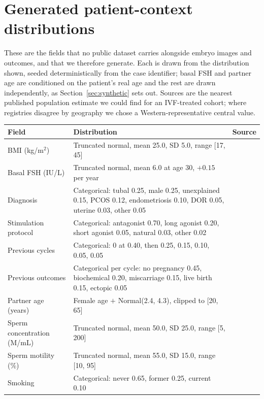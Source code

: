\documentclass[11pt]{article}
\begin{document}
\section{Generated patient-context distributions}
\label{app:distributions}
These are the fields that no public dataset carries alongside embryo images and outcomes, and that we therefore generate. Each is drawn from the distribution shown, seeded deterministically from the case identifier; basal FSH and partner age are conditioned on the patient's real age and the rest are drawn independently, as Section~\ref{sec:synthetic} sets out. Sources are the nearest published population estimate we could find for an IVF-treated cohort; where registries disagree by geography we chose a Western-representative central value.

\begin{table}[H]
\centering\footnotesize
\begin{tabular}{p{3.1cm}p{7.4cm}p{2.6cm}}
\toprule
\textbf{Field} & \textbf{Distribution} & \textbf{Source} \\
\midrule
BMI (kg/m$^2$) & Truncated normal, mean 25.0, SD 5.0, range [17, 45] & \citet{eshre2025} \\
Basal FSH (IU/L) & Truncated normal, mean 6.0 at age 30, $+0.15$ per year & \citet{eshre2025} \\
Diagnosis & Categorical: tubal 0.25, male 0.25, unexplained 0.15, PCOS 0.12, endometriosis 0.10, DOR 0.05, uterine 0.03, other 0.05 & \citet{eshre2025} \\
Stimulation protocol & Categorical: antagonist 0.70, long agonist 0.20, short agonist 0.05, natural 0.03, other 0.02 & \citet{yoo2026} \\
Previous cycles & Categorical: 0 at 0.40, then 0.25, 0.15, 0.10, 0.05, 0.05 & \citet{vanderborght2025} \\
Previous outcomes & Categorical per cycle: no pregnancy 0.45, biochemical 0.20, miscarriage 0.15, live birth 0.15, ectopic 0.05 & \citet{vanderborght2025} \\
Partner age (years) & Female age $+$ Normal(2.4, 4.3), clipped to [20, 65] & \citet{jelinkova2026} \\
Sperm concentration (M/mL) & Truncated normal, mean 50.0, SD 25.0, range [5, 200] & \citet{who2021semen} \\
Sperm motility (\%) & Truncated normal, mean 55.0, SD 15.0, range [10, 95] & \citet{who2021semen} \\
Smoking & Categorical: never 0.65, former 0.25, current 0.10 & \citet{dodge2015} \\

\end{tabular}
\end{table}
\end{document}
